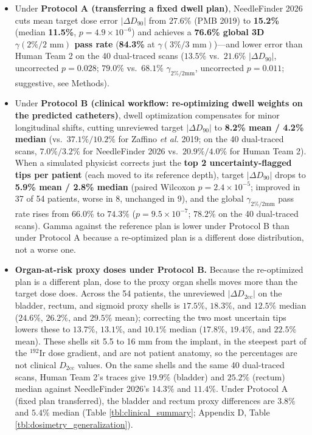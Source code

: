 \documentclass[
  11pt,
]{article}
\providecommand{\tightlist}{%
  \setlength{\itemsep}{0pt}\setlength{\parskip}{0pt}}
\begin{document}
\begin{itemize}
\tightlist
\item
  Under \textbf{Protocol A (transferring a fixed dwell plan)},
  NeedleFinder 2026 cuts mean target dose error \(|\Delta D_{90}|\) from
  \(27.6\%\) (PMB 2019) to \textbf{15.2\%} (median \textbf{11.5\%},
  \(p = 4.9 \times 10^{-6}\)) and achieves a \textbf{76.6\% global 3D
  \(\gamma(2\%/2\text{ mm})\) pass rate} (\textbf{84.3\%} at
  \(\gamma(3\%/3\text{ mm})\))---and lower error than Human Team 2 on
  the 40 dual-traced scans (\(13.5\%\) vs.~\(21.6\%\)
  \(|\Delta D_{90}|\), uncorrected \(p = 0.028\); \(79.0\%\)
  vs.~\(68.1\%\) \(\gamma_{2\%/2\text{mm}}\), uncorrected \(p = 0.011\);
  suggestive, see Methods).
\item
  Under \textbf{Protocol B (clinical workflow: re-optimizing dwell
  weights on the predicted catheters)}, dwell optimization compensates
  for minor longitudinal shifts, cutting unreviewed target
  \(|\Delta D_{90}|\) to \textbf{8.2\% mean / 4.2\% median}
  (vs.~\(37.1\% / 10.2\%\) for Zaffino \emph{et al.} 2019; on the 40
  dual-traced scans, \(7.0\% / 3.2\%\) for NeedleFinder 2026
  vs.~\(20.9\% / 4.0\%\) for Human Team 2). When a simulated physicist
  corrects just the \textbf{top 2 uncertainty-flagged tips per patient}
  (each moved to its reference depth), target \(|\Delta D_{90}|\) drops
  to \textbf{5.9\% mean / 2.8\% median} (paired Wilcoxon
  \(p = 2.4 \times 10^{-5}\); improved in 37 of 54 patients, worse in 8,
  unchanged in 9), and the global \(\gamma_{2\%/2\text{mm}}\) pass rate
  rises from \(66.0\%\) to \(74.3\%\) (\(p = 9.5 \times 10^{-7}\);
  \(78.2\%\) on the 40 dual-traced scans). Gamma against the reference
  plan is lower under Protocol B than under Protocol A because a
  re-optimized plan is a different dose distribution, not a worse one.
\item
  \textbf{Organ-at-risk proxy doses under Protocol B.} Because the
  re-optimized plan is a different plan, dose to the proxy organ shells
  moves more than the target dose does. Across the 54 patients, the
  unreviewed \(|\Delta D_{2\text{cc}}|\) on the bladder, rectum, and
  sigmoid proxy shells is \(17.5\%\), \(18.3\%\), and \(12.5\%\) median
  (\(24.6\%\), \(26.2\%\), and \(29.5\%\) mean); correcting the two most
  uncertain tips lowers these to \(13.7\%\), \(13.1\%\), and \(10.1\%\)
  median (\(17.8\%\), \(19.4\%\), and \(22.5\%\) mean). These shells sit
  5.5 to 16 mm from the implant, in the steepest part of the
  \(^{192}\text{Ir}\) dose gradient, and are not patient anatomy, so the
  percentages are not clinical \(D_{2\text{cc}}\) values. On the same
  shells and the same 40 dual-traced scans, Human Team 2's traces give
  \(19.9\%\) (bladder) and \(25.2\%\) (rectum) median against
  NeedleFinder 2026's \(14.3\%\) and \(11.4\%\). Under Protocol A (fixed
  plan transferred), the bladder and rectum proxy differences are
  \(3.8\%\) and \(5.4\%\) median (Table \ref{tbl:clinical_summary};
  Appendix D, Table \ref{tbl:dosimetry_generalization}).
\end{itemize}
\end{document}
